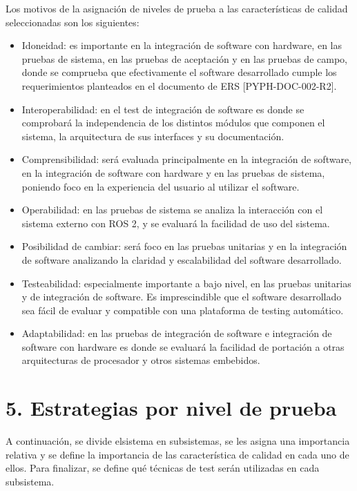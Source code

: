 \documentclass[
11pt, %
codirector, %
]{simple_charter}
\begin{document}
Los motivos de la asignación de niveles de prueba a las características de calidad seleccionadas son
los siguientes:

\begin{itemize}
	\item Idoneidad: es importante en la integración de software con hardware, en las pruebas de
	sistema, en las pruebas de aceptación y en las pruebas de campo, donde se comprueba que
	efectivamente el software desarrollado cumple los requerimientos planteados en el documento de
	ERS [PYPH-DOC-002-R2].
	\item Interoperabilidad: en el test de integración de software es donde se comprobará la
	independencia de los distintos módulos que componen el sistema, la arquitectura de sus
	interfaces y su documentación.
	\item Comprensibilidad: será evaluada principalmente en la integración de software, en la
	integración de software con hardware y en las pruebas de sistema, poniendo foco en la experiencia
	del usuario al utilizar el software.
	\item Operabilidad: en las pruebas de sistema se analiza la interacción con el sistema externo
	con ROS 2, y se evaluará la facilidad de uso del sistema.
	\item Posibilidad de cambiar: será foco en las pruebas unitarias y en la integración de software
	analizando la claridad y escalabilidad del software desarrollado.
	\item Testeabilidad: especialmente importante a bajo nivel, en las pruebas unitarias y de
	integración de software. Es imprescindible que el software desarrollado sea fácil de evaluar y
	compatible con una plataforma de testing automático.
	\item Adaptabilidad: en las pruebas de integración de software e integración de software con
	hardware es donde se evaluará la facilidad de portación a otras arquitecturas de procesador y
	otros sistemas embebidos.
\end{itemize}

\section{5. Estrategias por nivel de prueba}
\label{sec:5-estrategias-por-nivel-de-prueba}

A continuación, se divide elsistema en subsistemas, se les asigna una importancia relativa y se
define la importancia de las característica de calidad en cada uno de ellos.
Para finalizar, se define qué técnicas de test serán utilizadas en cada subsistema.
\end{document}

